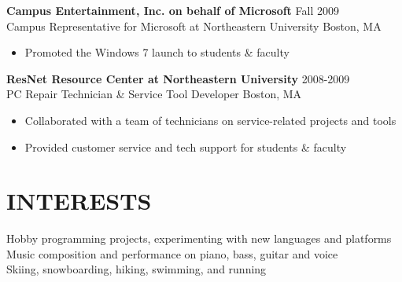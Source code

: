 \documentclass[line,margin]{res}
\begin{document}
\begin{resume}
	{\large \textbf{Campus Entertainment, Inc. on behalf of Microsoft}}
    \hfill Fall 2009 \\
	Campus Representative for Microsoft at Northeastern University
    \hfill Boston, MA
    \begin{itemize}  \itemsep -2pt
        \item Promoted the Windows 7 launch to students \& faculty
    \end{itemize}

	{\large \textbf{ResNet Resource Center at Northeastern University}}
    \hfill 2008-2009 \\
    PC Repair Technician \& Service Tool Developer
    \hfill Boston, MA
    \begin{itemize}  \itemsep -2pt %
        \item Collaborated with a team of technicians on service-related projects and tools
        \item Provided customer service and tech support for students \& faculty
    \end{itemize}

\section{INTERESTS}
    Hobby programming projects, experimenting with new languages and platforms \\
    Music composition and performance on piano, bass, guitar and voice \\
    Skiing, snowboarding, hiking, swimming, and running

\end{resume}
\end{document}
